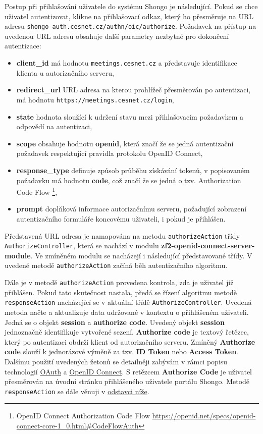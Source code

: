 \documentclass[
  printed, %
  twoside, %
  table,   %
  nolof,     %
  nolot,     %
]{fithesis3}
\begin{document}
Postup při přihlašování uživatele do systému Shongo je následující. Pokud se chce uživatel autentizovat, klikne na přihlašovací odkaz, který ho přesměruje na URL adresu \texttt{shongo-auth.cesnet.cz/authn/oic/authorize}. Požadavek na přístup na uvedenou URL adresu obsahuje další parametry nezbytné pro dokončení autentizace:
\label{shongo:state}
\begin{itemize}
    \item \textbf{client\_id} má hodnotu \texttt{meetings.cesnet.cz} a představuje identifikace klienta u autorizačního serveru,
    \item \textbf{redirect\_url} URL adresa na kterou prohlížeč přesměrován po autentizaci, má hodnotu \texttt{https://meetings.cesnet.cz/login}, 
    \item \textbf{state} hodnota sloužící k udržení stavu mezi přihlašovacím požadavkem a odpovědí na autentizaci, 
    \item \textbf{scope} obsahuje hodnotu \textbf{openid}, která značí že se jedná autentizační požadavek respektující pravidla protokolu OpenID Connect,
    \item \textbf{response\_type} definuje způsob průběhu získávání tokenů, v popisovaném požadavku má hodnotu \textbf{code}, což značí že se jedná o tzv. Authorization Code Flow \footnote{OpenID Connect Authorization Code Flow \url{https://openid.net/specs/openid-connect-core-1_0.html\#CodeFlowAuth}},
    \item \textbf{prompt} doplňková informace autorizačnímu serveru, požadující zobrazení autentizačního formuláře koncovému uživateli, i pokud je přihlášen. 
\end{itemize}


Představená URL adresa je namapována na metodu \texttt{authorizeAction} třídy \texttt{AuthorizeController}, která se nachází v modulu \textbf{zf2-openid-connect-server-module}. Ve zmíněném modulu  se nacházejí i následující představované třídy. V uvedené metodě \texttt{authorizeAction} začíná běh autentizačního algoritmu. \par 

Dále je v metodě \texttt{authorizeAction} provedena kontrola, zda je uživatel již přihlášen. Pokud tato skutečnost nastala, předá se řízení algoritmu metodě \texttt{responseAction} nacházející se v aktuální třídě \texttt{AuthorizeController}. Uvedená metoda načte a  aktualizuje data udržované v kontextu o přihlášeném uživateli. Jedná se o objekt \textbf{session} a \textbf{authorize code}. Uvedený objekt \textbf{session} jednoznačně identifikuje vytvořené sezení. \textbf{Authorize code} je textový řetězec, který po autentizaci obdrží klient od autorizačního serveru. Zmíněný \textbf{Authorize code} slouží k jednorázové výměně za tzv. \textbf{ID Token} nebo \textbf{Access Token}. Dalšímu použití uvedených žetonů se detailněji zabývám v rámci popisu technologií \hyperref[sec:oauth]{OAuth} a \hyperref[sec:oidc]{OpenID Connect}. S retězcem \textbf{Authorize Code} je uživatel přesměrován na úvodní stránku přihlášeného uživatele portálu Shongo. Metodě \texttt{responseAction} se dále věnuji v \hyperref[sec:responseAction]{odstavci níže}. \par 
\end{document}

